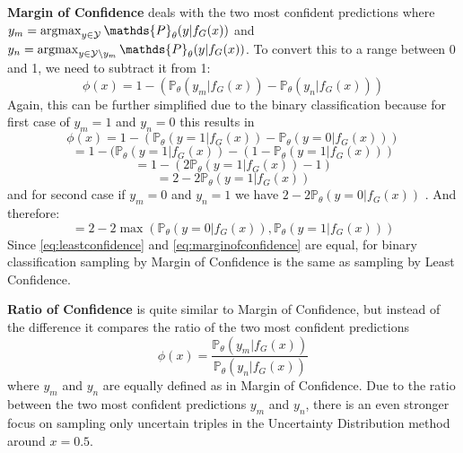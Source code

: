 \textbf{Margin of Confidence}
deals with the two most confident predictions where
$y_m = \argmax_{y \in \mathcal{Y}} \mathds{P}_{\theta}(y | f_G(x))$ 
and $y_n = \argmax_{y \in \mathcal{Y} \setminus y_m}{\mathds{P}_{\theta}(y | f_G(x))}$.
To convert this to a range between 0 and 1, we need to subtract it from 1:
\begin{equation}
    \phi(x) = 1 - (\mathds{P}_{\theta}(y_m |f_G(x)) - \mathds{P}_{\theta}(y_n | f_G(x)))
\end{equation}
Again, this can be further simplified due to the binary classification because for first case of $y_m = 1$ and $y_n = 0$ this results in
\begin{equation}
    \phi(x) = 1 - (\mathds{P}_{\theta}(y = 1 |f_G(x)) - \mathds{P}_{\theta}(y = 0 | f_G(x)))
\end{equation}
\begin{equation}
    = 1 - (\mathds{P}_{\theta}(y = 1 |f_G(x)) 
    -  (1 - \mathds{P}_{\theta}(y = 1 | f_G(x)))
\end{equation}
\begin{equation}
    = 1 - (2 \mathds{P}_{\theta}(y = 1 |f_G(x)) - 1)
\end{equation}
\begin{equation}
    = 2 - 2 \mathds{P}_{\theta}(y = 1 |f_G(x))
\end{equation}
and for second case if $y_m = 0$ and $y_n = 1$ we have  $ 2 - 2 \mathds{P}_{\theta}(y = 0 |f_G(x))$ . 
And therefore:
\begin{equation} \label{eq:marginofconfidence}
    = 2 - 2 \max(\mathds{P}_{\theta}(y = 0 |f_G(x)), \mathds{P}_{\theta}(y = 1 |f_G(x)))
\end{equation}
Since \autoref{eq:leastconfidence} and \ref{eq:marginofconfidence} are equal, for binary classification sampling by Margin of Confidence is the same as sampling by Least Confidence.

\textbf{Ratio of Confidence}
is quite similar to Margin of Confidence, but instead of the difference it compares the ratio of the two most confident predictions
\begin{equation}
    \phi(x) = \frac{\mathds{P}_{\theta}(y_m | f_G(x))}{\mathds{P}_{\theta}(y_n | f_G(x))} 
\end{equation}
where $y_m$ and $y_n$ are equally defined as in Margin of Confidence.
Due to the ratio between the two most confident predictions $y_m$ and $y_n$, there is an even stronger focus on sampling only uncertain triples in the Uncertainty Distribution method around $x = 0.5$.


